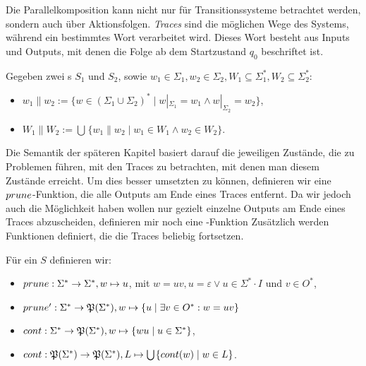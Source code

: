 Die Parallelkomposition kann nicht nur für Transitionssysteme betrachtet
werden, sondern auch über Aktionsfolgen. \emph{Traces} sind die möglichen Wege
des Systems, während ein bestimmtes Wort verarbeitet wird. Dieses Wort besteht
aus Inputs und Outputs, mit denen die Folge ab dem Startzustand $q_0$
beschriftet ist.

\begin{Def}
  Gegeben zwei \EIO{}s $S_1$ und $S_2$, sowie $w_1\in\Sigma _1, w_2\in\Sigma
  _2, W_1\subseteq\Sigma _1^*, W_2\subseteq\Sigma _2^*$:
  \begin{itemize}
    \item $w_1\| w_2:=\{w\in (\Sigma _1\cup\Sigma _2)^*\mid w|_{\Sigma _1}=w_1\wedge
      w|_{\Sigma _2}=w_2\}$,
    \item $W_1\| W_2:=\bigcup\hspace{1pt}\{w_1\| w_2\mid w_1\in W_1\wedge w_2\in W_2\}$.
  \end{itemize}
\end{Def}

Die Semantik der späteren Kapitel basiert darauf die jeweiligen Zustände, die
zu Problemen führen, mit den Traces zu betrachten, mit denen man diesem
Zustände erreicht. Um dies besser umsetzten zu können, definieren wir eine
$prune{}$-Funktion, die alle Outputs am Ende eines Traces entfernt. Da wir
jedoch auch die Möglichkeit haben wollen nur gezielt einzelne Outputs am Ende
eines Traces abzuscheiden, definieren mir noch eine \prunenew{}-Funktion
Zusätzlich werden Funktionen definiert, die die Traces beliebig fortsetzen.

\begin{Def}
  Für ein \EIO{} $S$ definieren wir:
  \begin{itemize}
    \item $prune{}:\Sigma ^*\rightarrow\Sigma ^*, w\mapsto u$, mit $w=uv,
      u=\varepsilon\vee u\in\Sigma ^*\cdot I$ und $v\in O^*$,
    \item $prune'{}:\Sigma ^*\rightarrow\mathfrak{P}(\Sigma ^*), w\mapsto
      \{u\mid \exists v\in O^*: w=uv\}$
    \item $cont{}:\Sigma ^*\rightarrow\mathfrak{P}(\Sigma ^*),
      w\mapsto\{wu\mid u\in\Sigma ^*\}$,
    \item $cont{}:\mathfrak{P}(\Sigma ^*)\rightarrow\mathfrak{P}(\Sigma ^*),
      L\mapsto\bigcup\hspace{1pt}\{cont{}(w)\mid w\in L\}$.
  \end{itemize}
\end{Def}

